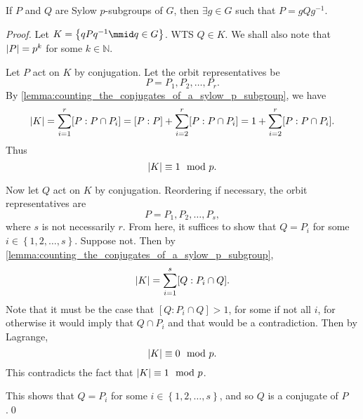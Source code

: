 \documentclass[notoc,notitlepage]{tufte-book}
\begin{document}
\begin{thm}\label{thm:second_sylow_theorem}
  If $P$ and $Q$ are Sylow $p$-subgroups of $G$, then
  $\exists g \in G$ such that $P = gQg^{-1}$.
\end{thm}

\begin{proof}
  Let $K = \left\{ qPq^{-1} \mmid q \in G \right\}$. WTS $Q \in K$.
  We shall also note that $\left|P\right| = p^k$ for some $k \in \mathbb{N}$.

  Let $P$ act on $K$ by conjugation. Let the orbit representatives be
  \begin{equation*}
    P = P_1, P_2, \ldots, P_r.
  \end{equation*}
  By \cref{lemma:counting_the_conjugates_of_a_sylow_p_subgroup}, we have
  \begin{equation*}
    \left|K\right| = \sum_{i=1}^{r} [ P : P \cap P_i ] 
            = [ P : P ] + \sum_{i=2}^{r} [ P : P \cap P_i ]
            = 1 + \sum_{i=2}^{r} [ P : P \cap P_i ].
  \end{equation*}
  Thus
  \begin{equation*}
    \left|K\right| \equiv 1 \mod p.
  \end{equation*}

  Now let $Q$ act on $K$ by conjugation. Reordering if necessary, the
  orbit representatives are
  \begin{equation*}
    P = P_1, P_2, \ldots, P_s,
  \end{equation*}
  where $s$ is not necessarily $r$. From here, it suffices to show that
  $Q = P_i$ for some $i \in \left\{ 1, 2, \ldots, s \right\}$. Suppose
  not. Then by \cref{lemma:counting_the_conjugates_of_a_sylow_p_subgroup},
  \begin{equation*}
    \left|K\right| = \sum_{i=1}^{s} [ Q : P_i \cap Q ].
  \end{equation*}
  Note that it must be the case that $[ Q : P_i \cap Q ] > 1$, for some if
  not all $i$, for otherwise it would imply that $Q \cap P_i$ and that would
  be a contradiction. Then by Lagrange,
  \begin{equation*}
    \left|K\right| \equiv 0 \mod p.
  \end{equation*}
  This contradicts the fact that $\left|K\right| \equiv 1 \mod p$.

  This shows that $Q = P_i$ for some $i \in \left\{ 1, 2, \ldots, s \right\}$,
  and so $Q$ is a conjugate of $P$.\qed\
\end{proof}
\end{document}
